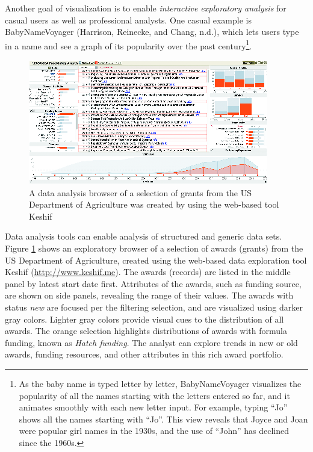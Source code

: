 \documentclass[]{krantz}
\begin{document}
Another goal of visualization is to enable \emph{interactive exploratory
analysis} for casual users as well as professional analysts. One casual
example is BabyNameVoyager (Harrison, Reinecke, and Chang, n.d.), which
lets users type in a name and see a graph of its popularity over the
past century\footnote{As the baby name is typed letter by letter,
  BabyNameVoyager visualizes the popularity of all the names starting
  with the letters entered so far, and it animates smoothly with each
  new letter input. For example, typing ``Jo'' shows all the names
  starting with ``Jo''. This view reveals that Joyce and Joan were
  popular girl names in the 1930s, and the use of ``John'' has declined
  since the 1960s.}.

\begin{figure}

{\centering \includegraphics[width=0.7\linewidth]{ChapterViz/figures/fig9-2} 

}

\caption{A data analysis browser of a selection of grants from the US Department of Agriculture was created by using the web-based tool Keshif}\label{fig:fig9-2}
\end{figure}

Data analysis tools can enable analysis of structured and generic data
sets. Figure \ref{fig:fig9-2} shows an exploratory browser of a
selection of awards (grants) from the US Department of Agriculture,
created using the web-based data exploration tool Keshif
(\url{http://www.keshif.me}). The awards (records) are listed in the
middle panel by latest start date first. Attributes of the awards, such
as funding source, are shown on side panels, revealing the range of
their values. The awards with status \emph{new} are focused per the
filtering selection, and are visualized using darker gray colors.
Lighter gray colors provide visual cues to the distribution of all
awards. The orange selection highlights distributions of awards with
formula funding, known as \emph{Hatch funding}. The analyst can explore
trends in new or old awards, funding resources, and other attributes in
this rich award portfolio.
\end{document}
